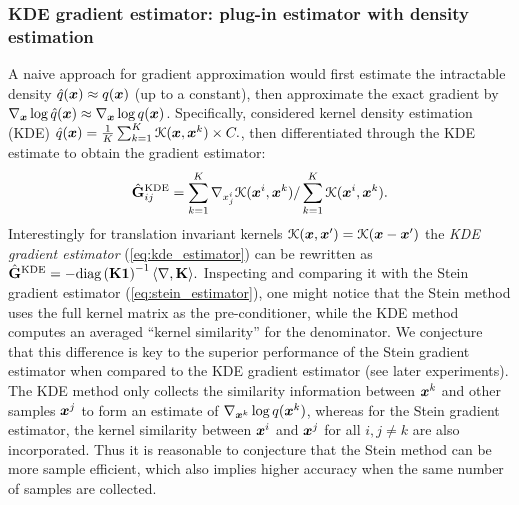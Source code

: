 \subsubsection{KDE gradient estimator: plug-in estimator with density estimation}
A naive approach for gradient approximation would first estimate the intractable density $\hat{q}(\bm{x}) \approx q(\bm{x})$ (up to a constant), then approximate the exact gradient by $\nabla_{\bm{x}} \log \hat{q}(\bm{x}) \approx \nabla_{\bm{x}} \log q(\bm{x})$. Specifically, \cite{singh:kernel_gradient1977} considered kernel density estimation (KDE) 
$\hat{q}(\bm{x}) = \frac{1}{K} \sum_{k=1}^K \mathcal{K}(\bm{x}, \bm{x}^k) \times C.$, then differentiated through the KDE estimate to obtain the gradient estimator:
\begin{equation}
\hat{\mathbf{G}}^{\text{KDE}}_{ij} = \sum_{k=1}^K \nabla_{x^i_j} \mathcal{K}(\bm{x}^i, \bm{x}^k) / \sum_{k=1}^K \mathcal{K}(\bm{x}^i, \bm{x}^k).
\label{eq:kde_estimator}
\end{equation}
%
Interestingly for translation invariant kernels $\mathcal{K}(\bm{x}, \bm{x}') = \mathcal{K}(\bm{x} - \bm{x}')$ the \emph{KDE gradient estimator} (\ref{eq:kde_estimator}) can be rewritten as $\hat{\mathbf{G}}^{\text{KDE}} = -\text{diag}\left( \mathbf{K} \bm{1} \right)^{-1} \langle \nabla, \mathbf{K} \rangle.$
Inspecting and comparing it with the Stein gradient estimator (\ref{eq:stein_estimator}), one might notice that the Stein method uses the full kernel matrix as the pre-conditioner, while the KDE method computes an averaged ``kernel similarity'' for the denominator. We conjecture that this difference is key to the superior performance of the Stein gradient estimator when compared to the KDE gradient estimator (see later experiments). The KDE method only collects the similarity information between $\bm{x}^k$ and other samples $\bm{x}^j$ to form an estimate of $\nabla_{\bm{x}^k} \log q(\bm{x}^k)$, whereas for the Stein gradient estimator, the kernel similarity between $\bm{x}^i$ and $\bm{x}^j$ for all $i, j \neq k$ are also incorporated. Thus it is reasonable to conjecture that the Stein method can be more sample efficient, which also implies higher accuracy when the same number of samples are collected.

